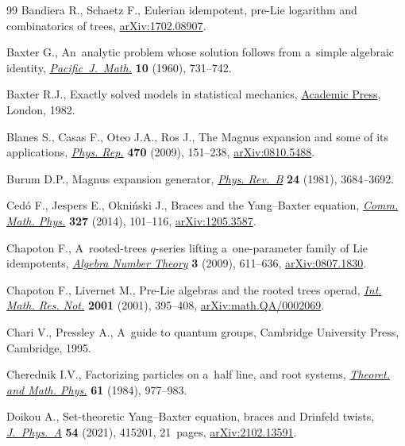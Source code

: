 \documentclass[10pt,a4paper]{amsart}
\numberwithin{equation}{section}
\theoremstyle{definition}
\begin{document}
\begin{thebibliography}{99}
Bandiera R., Schaetz F., Eulerian idempotent, pre-{L}ie logarithm and
 combinatorics of trees,
 \href{http://arxiv.org/abs/1702.08907}{arXiv:1702.08907}.

Baxter G., An~analytic problem whose solution follows from a~simple algebraic
 identity,
 \href{https://doi.org/10.2140/pjm.1960.10.731}{\textit{Pacific~J.~Math.}}
 \textbf{10} (1960), 731--742.

Baxter R.J., Exactly solved models in statistical mechanics,
 \href{https://doi.org/10.1142/9789814415255_0002}{Academic Press}, London,
 1982.

Blanes S., Casas F., Oteo J.A., Ros J., The {M}agnus expansion and some of its
 applications,
 \href{https://doi.org/10.1016/j.physrep.2008.11.001}{\textit{Phys. Rep.}}
 \textbf{470} (2009), 151--238,
 \href{http://arxiv.org/abs/0810.5488}{arXiv:0810.5488}.

Burum D.P., Magnus expansion generator,
 \href{https://doi.org/10.1103/PhysRevB.24.3684}{\textit{Phys. Rev.~B}}
 \textbf{24} (1981), 3684--3692.

Ced\'o F., Jespers E., Okni\'{n}ski J., Braces and the {Y}ang--{B}axter
 equation, \href{https://doi.org/10.1007/s00220-014-1935-y}{\textit{Comm.
 Math. Phys.}} \textbf{327} (2014), 101--116,
 \href{http://arxiv.org/abs/1205.3587}{arXiv:1205.3587}.

Chapoton F., A~rooted-trees {$q$}-series lifting a~one-parameter family of
 {L}ie idempotents,
 \href{https://doi.org/10.2140/ant.2009.3.611}{\textit{Algebra Number Theory}}
 \textbf{3} (2009), 611--636,
 \href{http://arxiv.org/abs/0807.1830}{arXiv:0807.1830}.

Chapoton F., Livernet M., Pre-{L}ie algebras and the rooted trees operad,
 \href{https://doi.org/10.1155/S1073792801000198}{\textit{Int. Math. Res.
 Not.}} \textbf{2001} (2001), 395--408,
 \href{http://arxiv.org/abs/math.QA/0002069}{arXiv:math.QA/0002069}.

Chari V., Pressley A., A~guide to quantum groups, Cambridge University Press,
 Cambridge, 1995.

Cherednik I.V., Factorizing particles on a~half line, and root systems,
 \href{https://doi.org/10.1007/BF01038545}{\textit{Theoret. and Math. Phys.}}
 \textbf{61} (1984), 977--983.

Doikou A., Set-theoretic {Y}ang--{B}axter equation, braces and {D}rinfeld
 twists, \href{https://doi.org/10.1088/1751-8121/ac219e}{\textit{J.~Phys.~A}}
 \textbf{54} (2021), 415201, 21~pages,
 \href{http://arxiv.org/abs/2102.13591}{arXiv:2102.13591}.


\end{thebibliography}
\end{document}
